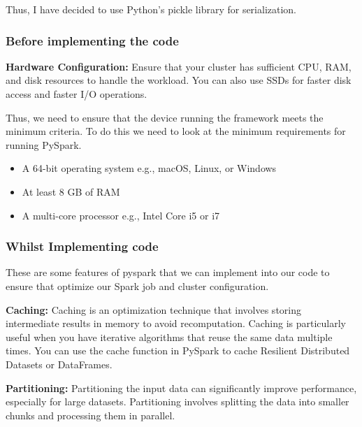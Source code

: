 \documentclass[]{final_report}
\begin{document}
Thus, I have decided to use Python's pickle library for serialization.

\clearpage

\subsubsection{Before implementing the code}
\textbf{Hardware Configuration:} Ensure that your cluster has sufficient CPU, RAM, and disk resources to handle the workload. You can also use SSDs for faster disk access and faster I/O operations.

Thus, we need to ensure that the device running the framework meets the minimum criteria. To do this we need to look at the minimum requirements for running PySpark. 

\begin{itemize}
    \item A 64-bit operating system e.g., macOS, Linux, or Windows
    \item At least 8 GB of RAM
    \item A multi-core processor e.g., Intel Core i5 or i7
\end{itemize}

\subsubsection{Whilst Implementing code}
These are some features of pyspark that we can implement into our code to ensure that optimize our Spark job and cluster configuration.

\textbf{Caching:} Caching is an optimization technique that involves storing intermediate results in memory to avoid recomputation. Caching is particularly useful when you have iterative algorithms that reuse the same data multiple times. You can use the cache function in PySpark to cache Resilient Distributed Datasets or DataFrames.

\textbf{Partitioning:} Partitioning the input data can significantly improve performance, especially for large datasets. Partitioning involves splitting the data into smaller chunks and processing them in parallel.

\clearpage
\end{document}
